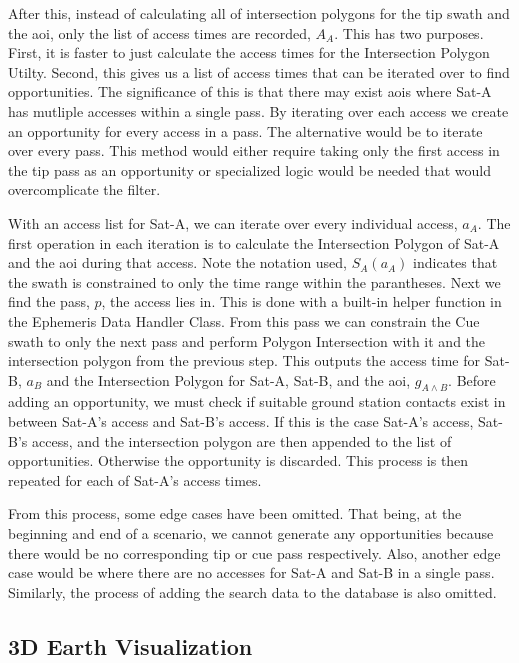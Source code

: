 After this, instead of calculating all of intersection polygons for the tip
swath and the \gls{aoi}, only the list of access times are recorded, $A_A$.
This has two purposes.  First, it is faster to just calculate the access times
for the Intersection Polygon Utilty. Second, this gives us a list of access
times that can be iterated over to find opportunities. The significance of this
is that there may exist \glspl{aoi} where Sat-A has mutliple accesses within a
single pass. By iterating over each access we create an opportunity for every
access in a pass.  The alternative would be to iterate over every pass. This
method would either require taking only the first access in the tip pass as an
opportunity or specialized logic would be needed that would overcomplicate the
filter.

With an access list for Sat-A, we can iterate over every individual access,
$a_A$. The first operation in each iteration is to calculate the Intersection
Polygon of Sat-A and the \gls{aoi} during that access. Note the notation used,
$S_A(a_A)$ indicates that the swath is constrained to only the time range
within the parantheses. Next we find the pass, $p$, the access lies in.  This
is done with a built-in helper function in the Ephemeris Data Handler Class.
From this pass we can constrain the Cue swath to only the next pass and perform
Polygon Intersection with it and the intersection polygon from the previous
step. This outputs the access time for Sat-B, $a_B$ and the Intersection
Polygon for Sat-A, Sat-B, and the \gls{aoi}, $g_{A \wedge B}$. Before adding an
opportunity, we must check if suitable ground station contacts exist in between
Sat-A's access and Sat-B's access. If this is the case Sat-A's access, Sat-B's
access, and the intersection polygon are then appended to the list of
opportunities. Otherwise the opportunity is discarded. This process is then
repeated for each of Sat-A's access times.

From this process, some edge cases have been omitted. That being, at the
beginning and end of a scenario, we cannot generate any opportunities because
there would be no corresponding tip or cue pass respectively. Also, another
edge case would be where there are no accesses for Sat-A and Sat-B in a single
pass. Similarly, the process of adding the search data to the database is also
omitted.


\subsection{3D Earth Visualization}

